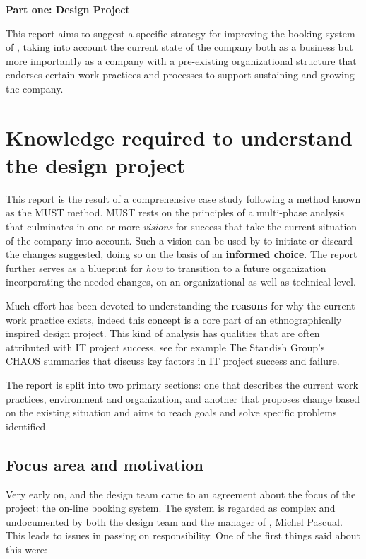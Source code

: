 \textbf{\LARGE{Part one: Design Project}}

This report aims to suggest a specific strategy for improving the booking system
of \gomonkey{}, taking into account the current state of the company both as a
business but more importantly as a company with a pre-existing organizational
structure that endorses certain work practices and processes to support
sustaining and growing the company.

\section{Knowledge required to understand the design project}
This report is the result of a comprehensive case study following a method known
as the MUST method. MUST rests on the principles of a multi-phase analysis that
culminates in one or more \textit{visions} for success that take the current
situation of the company into account. Such a vision can be used by \gomonkey{}
to initiate or discard the changes suggested, doing so on the basis of an
\textbf{informed choice}. The report further serves as a blueprint for
\textit{how} to transition to a future organization incorporating the needed
changes, on an organizational as well as technical level.

Much effort has been devoted to understanding the \textbf{reasons} for why the
current work practice exists, indeed this concept is a core part of an
ethnographically inspired design project. This kind of analysis has qualities
that are often attributed with IT project success, see for example The Standish
Group's CHAOS summaries that discuss key factors in IT project success and
failure.

The report is split into two primary sections: one that describes the current
work practices, environment and organization, and another that proposes change
based on the existing situation and aims to reach goals and solve specific
problems identified.

\subsection{Focus area and motivation}
Very early on, \gomonkey{} and the design team came to an agreement about the
focus of the project: the on-line booking system. The system is regarded as
complex and undocumented by both the design team and the manager of \gomonkey{}, 
Michel Pascual. This leads to issues in passing on responsibility. One of the
first things said about this were:

